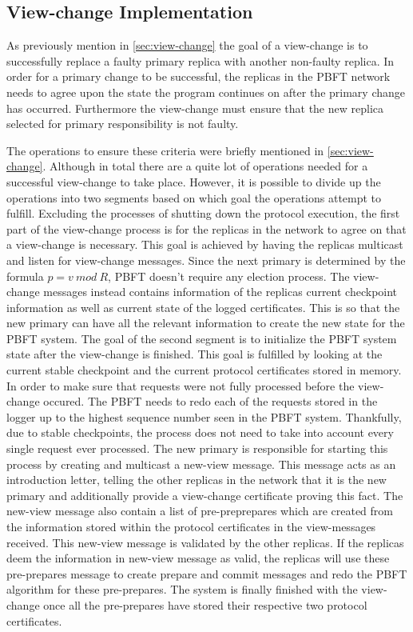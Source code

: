 \subsection{View-change Implementation}
As previously mention in \autoref{sec:view-change} the goal of a view-change is to successfully replace a faulty primary replica with another non-faulty replica. In order for a primary change to be successful, the replicas in the PBFT network needs to agree upon the state the program continues on after the primary change has occurred. Furthermore the view-change must ensure that the new replica selected for primary responsibility is not faulty. 

The operations to ensure these criteria were briefly mentioned in \autoref{sec:view-change}. Although in total there are a quite lot of operations needed for a successful view-change to take place. However, it is possible to divide up the operations into two segments based on which goal the operations attempt to fulfill. Excluding the processes of shutting down the protocol execution, the first part of the view-change process is for the replicas in the network to agree on that a view-change is necessary. This goal is achieved by having the replicas multicast and listen for view-change messages. Since the next primary is determined by the formula $p = v ~mod~ R$, PBFT doesn't require any election process. The view-change messages instead contains information of the replicas current checkpoint information as well as current state of the logged certificates. This is so that the new primary can have all the relevant information to create the new state for the PBFT system. The goal of the second segment is to initialize the PBFT system state after the view-change is finished. This goal is fulfilled by looking at the current stable checkpoint and the current protocol certificates stored in memory. In order to make sure that requests were not fully processed before the view-change occured. The PBFT needs to redo each of the requests stored in the logger up to the highest sequence number seen in the PBFT system. Thankfully, due to stable checkpoints, the process does not need to take into account every single request ever processed. The new primary is responsible for starting this process by creating and multicast a new-view message. This message acts as an introduction letter, telling the other replicas in the network that it is the new primary and additionally provide a view-change certificate proving this fact. The new-view message also contain a list of pre-preprepares which are created from the information stored within the protocol certificates in the view-messages received. This new-view message is validated by the other replicas. If the replicas deem the information in new-view message as valid, the replicas will use these pre-prepares message to create prepare and commit messages and redo the PBFT algorithm for these pre-prepares. The system is finally finished with the view-change once all the pre-prepares have stored their respective two protocol certificates. 

